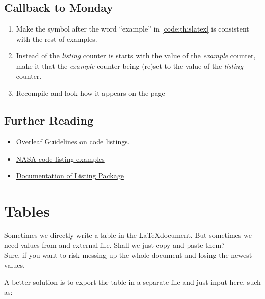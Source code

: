 \documentclass[a4paper,10pt]{report} %
\newcounter{samplecode}[chapter]
\begin{document}
\subsection{Callback to Monday}
\begin{enumerate} 
 \item Make the symbol after the word ``example'' in \ref{code:thislatex} is consistent with the rest of examples. 
 \item Instead of the \emph{listing} counter is starts with the value of the \emph{example} counter, make it that the \emph{example} counter being (re)set to the value of the \emph{listing} counter.
 \item Recompile and look how it appears on the page \pageref{listings}
\end{enumerate}

\subsection*{Further Reading}
\begin{itemize}
 \item \href{https://www.overleaf.com/learn/latex/Code_listing}{Overleaf Guidelines on code listings.}
 \item \href{https://nasa.github.io/nasa-latex-docs/html/examples/listing.html}{NASA code listing examples}
 \item \href{https://texdoc.org/serve/listings.pdf/0}{Documentation of Listing Package}
\end{itemize}


\newpage 

\section{Tables}

Sometimes we directly write a table in the \LaTeX document. But sometimes we need values from and external file. Shall we just copy and paste them?~\vspace{2ex}\\
Sure, if you want to risk messing up the whole document and losing the newest values.~\vspace{2ex}

\noindent
A better solution is to export the table in a separate file and just input here, such as:
\begin{lstlisting}[language={[latex]tex}, frame=single,basicstyle=\footnotesize]
  
\end{lstlisting}
\end{document}
